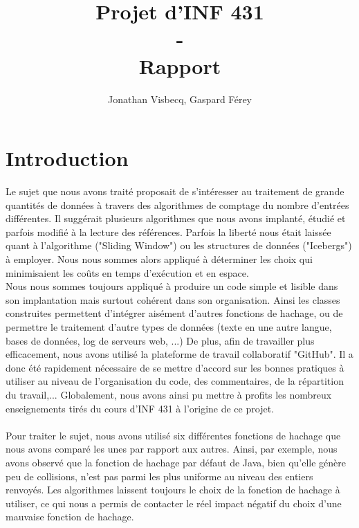 \documentclass[12pt,a4paper,titlepage]{article}
\author{Jonathan Visbecq, Gaspard Férey}
\title{Projet d'INF 431 \\ - \\ Rapport}
\begin{document}
\maketitle

\tableofcontents
\newpage

\section*{Introduction}

Le sujet que nous avons traité proposait de s'intéresser au traitement de grande quantités de données à travers des algorithmes de comptage du nombre d'entrées différentes. Il suggérait plusieurs algorithmes que nous avons implanté, étudié et parfois modifié à la lecture des références. Parfois la liberté nous était laissée quant à l'algorithme ("Sliding Window") ou les structures de données ("Icebergs") à employer. Nous nous sommes alors appliqué à déterminer les choix qui minimisaient les coûts en temps d'exécution et en espace.\\

Nous nous sommes toujours appliqué à produire un code simple et lisible dans son implantation mais surtout cohérent dans son organisation. Ainsi les classes construites permettent d'intégrer aisément d'autres fonctions de hachage, ou de permettre le traitement d'autre types de données (texte en une autre langue, bases de données, log de serveurs web, ...) De plus, afin de travailler plus efficacement, nous avons utilisé la plateforme de travail collaboratif "GitHub". Il a donc été rapidement nécessaire de se mettre d'accord sur les bonnes pratiques à utiliser au niveau de l'organisation du code, des commentaires, de la répartition du travail,... Globalement, nous avons ainsi pu mettre à profits les nombreux enseignements tirés du cours d'INF 431 à l'origine de ce projet.\\
\\

Pour traiter le sujet, nous avons utilisé six différentes fonctions de hachage que nous avons comparé les unes par rapport aux autres. Ainsi, par exemple, nous avons observé que la fonction de hachage par défaut de Java, bien qu'elle génère peu de collisions, n'est pas parmi les plus uniforme au niveau des entiers renvoyés. Les algorithmes laissent toujours le choix de la fonction de hachage à utiliser, ce qui nous a permis de contacter le réel impact négatif du choix d'une mauvaise fonction de hachage.\\
\end{document}
